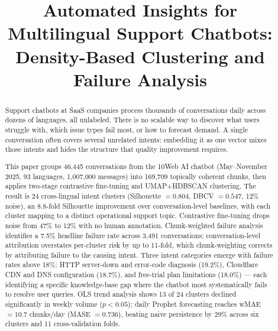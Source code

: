 \documentclass[conference]{IEEEtran}
\begin{document}
\thispagestyle{empty}
\pagestyle{empty}

\title{Automated Insights for Multilingual Support Chatbots: Density-Based Clustering and Failure Analysis}

\author{
  \and
}

\maketitle

\begin{abstract}
Support chatbots at SaaS companies process thousands of conversations daily across dozens of languages, all unlabeled. There is no scalable way to discover what users struggle with, which issue types fail most, or how to forecast demand. A single conversation often covers several unrelated intents: embedding it as one vector mixes those intents and hides the structure that quality improvement requires.

This paper groups 46{,}445 conversations from the 10Web AI chatbot (May--November 2025, 93 languages, 1{,}007{,}000 messages) into 169{,}709 topically coherent chunks, then applies two-stage contrastive fine-tuning and UMAP+HDBSCAN clustering. The result is 24 cross-lingual intent clusters (Silhouette $= 0.804$, DBCV $= 0.547$, 12\% noise), an 8.8-fold Silhouette improvement over conversation-level baselines, with each cluster mapping to a distinct operational support topic. Contrastive fine-tuning drops noise from 47\% to 12\% with no human annotation. Chunk-weighted failure analysis identifies a 7.5\% headline failure rate across 3{,}491 conversations; conversation-level attribution overstates per-cluster risk by up to 11-fold, which chunk-weighting corrects by attributing failure to the causing intent. Three intent categories emerge with failure rates above 18\%: HTTP server-down and error-code diagnosis (19.2\%), Cloudflare CDN and DNS configuration (18.7\%), and free-trial plan limitations (18.0\%) — each identifying a specific knowledge-base gap where the chatbot most systematically fails to resolve user queries. OLS trend analysis shows 13 of 24 clusters declined significantly in weekly volume ($p < 0.05$); daily Prophet forecasting reaches wMAE $= 10.7$ chunks/day (MASE $= 0.736$), beating naive persistence by 29\% across six clusters and 11 cross-validation folds.
\end{abstract}
\end{document}
